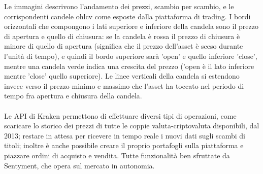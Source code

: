 \documentclass{article}
\numberwithin{equation}{section}
\begin{document}
		Le immagini descrivono l'andamento dei prezzi, scambio per scambio, e le corrispondenti candele ohlcv come esposte dalla piattaforma di trading. I bordi orizzontali che compongono i lati superiore e inferiore della candela sono il prezzo di apertura e quello di chiusura: se la candela è rossa il prezzo di chiusura è minore di quello di apertura (significa che il prezzo dell'asset è sceso durante l'unità di tempo), e quindi il bordo superiore sarà 'open' e quello inferiore 'close', mentre una candela verde indica una crescita del prezzo ('open è il lato inferiore mentre 'close' quello superiore). Le linee verticali della candela si estendono invece verso il prezzo minimo e massimo che l'asset ha toccato nel periodo di tempo fra apertura e chiusura della candela.
		\\~\\
		Le API di Kraken permettono di effettuare diversi tipi di operazioni, come scaricare lo storico dei prezzi di tutte le coppie valuta-criptovaluta disponibili, dal 2013; restare in attesa per ricevere in tempo reale i nuovi dati sugli scambi di titoli; inoltre è anche possibile creare il proprio portafogli sulla piattaforma e piazzare ordini di acquisto e vendita. Tutte funzionalità ben sfruttate da Sentyment, che opera sul mercato in autonomia.
		
		
		
\end{document}
